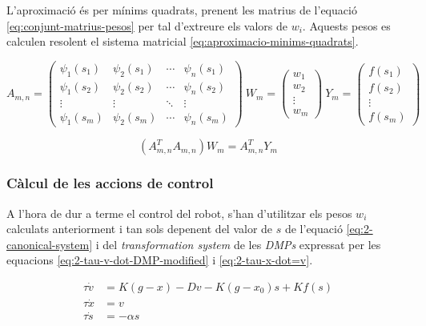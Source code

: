 \documentclass[12pt,a4paper,final,twoside]{report}
\begin{document}
L'aproximació és per mínims quadrats, prenent les matrius de l'equació \eqref{eq:conjunt-matrius-pesos} per tal d'extreure els valors de $w_i$. Aquests pesos es calculen resolent el sistema matricial \eqref{eq:aproximacio-minims-quadrats}.

\begin{equation}
A_{m,n} = \begin{pmatrix}
  \psi_1(s_1) & \psi_2(s_1) & \cdots & \psi_n(s_1) \\
  \psi_1(s_2) & \psi_2(s_2) & \cdots & \psi_n(s_2) \\
  \vdots  & \vdots  & \ddots & \vdots  \\
  \psi_1(s_m) & \psi_2(s_m) & \cdots & \psi_n(s_m)
\end{pmatrix}
~
W_m = \begin{pmatrix}
  w_1\\
  w_2\\
  \vdots \\
  w_m
\end{pmatrix}
~
Y_m = \begin{pmatrix}
  f(s_1)\\
  f(s_2)\\
  \vdots \\
  f(s_m)
\end{pmatrix}
\label{eq:conjunt-matrius-pesos}
\end{equation}

\begin{equation}
(A_{m,n}^T A_{m,n}) W_m = A_{m,n}^T Y_m
\label{eq:aproximacio-minims-quadrats}
\end{equation}

\subsubsection{Càlcul de les accions de control}

A l'hora de dur a terme el control del robot, s'han d'utilitzar els pesos $w_i$ calculats anteriorment i tan sols depenent del valor de $s$ de l'equació \eqref{eq:2-canonical-system} i del \textit{transformation system} de les \textit{DMPs} expressat per les equacions \eqref{eq:2-tau-v-dot-DMP-modified} i \eqref{eq:2-tau-x-dot=v}.

\begin{align}
\tau \dot{v} &= K(g - x) - Dv - K(g - x_0)s + K f(s)\label{eq:2-tau-v-dot-DMP-modified}\\
\tau \dot{x} &= v\label{eq:2-tau-x-dot=v}\\
\tau \dot{s} &= - \alpha s \label{eq:2-canonical-system}
\end{align}
\end{document}

